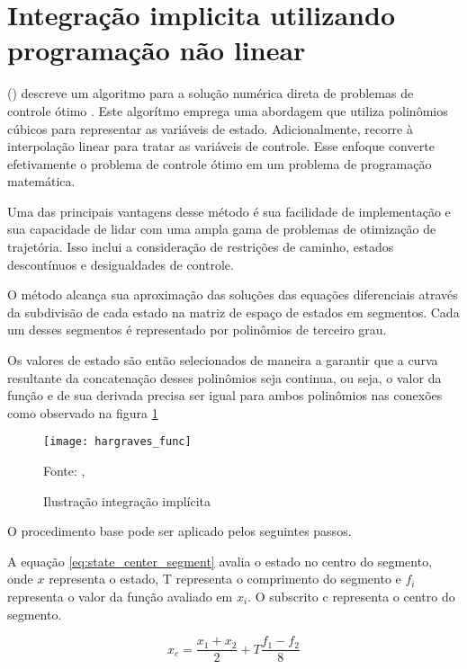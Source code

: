 \section{Integração implicita utilizando programação não linear}

\citeauthor{hargraves87} (\citeyear{hargraves87}) descreve um algoritmo para a solução numérica direta de problemas de controle ótimo \cite{hargraves87}. 
Este algorítmo emprega uma abordagem que utiliza polinômios cúbicos para representar as variáveis de estado. Adicionalmente, recorre à interpolação linear para tratar as variáveis de controle. 
Esse enfoque converte efetivamente o problema de controle ótimo em um problema de programação matemática.

Uma das principais vantagens desse método é sua facilidade de implementação e sua capacidade de lidar com uma ampla gama de problemas de otimização de trajetória. Isso inclui a consideração de restrições de caminho, estados descontínuos e desigualdades de controle.

O método alcança sua aproximação das soluções das equações diferenciais através da subdivisão de cada estado na matriz de espaço de estados em segmentos. Cada um desses segmentos é representado por polinômios de terceiro grau.

Os valores de estado são então selecionados de maneira a garantir que a curva resultante da concatenação desses polinômios seja continua, ou seja,
o valor da função e de sua derivada precisa ser igual para ambos polinômios nas conexões como observado na figura \ref{fig:hargraves_fun}

\begin{figure}[!htb]
    \centering
    \caption{Ilustração integração implícita}
    \texttt{[image: hargraves\_func]}

    {\footnotesize Fonte: \citeauthor{hargraves87}, \citeyear{hargraves87}}
    \label{fig:hargraves_fun}
\end{figure}

O procedimento base pode ser aplicado pelos seguintes passos.

A equação \ref{eq:state_center_segment} avalia o estado no centro do segmento, onde $x$ representa o estado, 
T representa o comprimento do segmento e $f_i$ representa o valor da função avaliado em $x_i$.
O subscrito c representa o centro do segmento.

\begin{equation}
    \label{eq:state_center_segment}
    x_c = \frac{x_{1} + x_{2}}{2} + T\frac{f_{1} - f_{2}}{8}
\end{equation}


